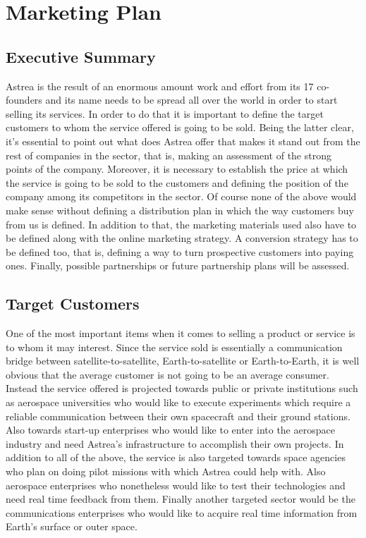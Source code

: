 \section{Marketing Plan}
\subsection{Executive Summary}
Astrea is the result of an enormous amount work and effort from its 17 co-founders and its name needs to be spread all over the world in order to start selling its services. In order to do that it is important to define the target customers to whom the service offered is going to be sold. Being the latter clear, it's essential to point out what does Astrea offer that makes it stand out from the rest of companies in the sector, that is, making an assessment of the strong points of the company. Moreover, it is necessary to establish the price at which the service is going to be sold to the customers and defining the position of the company among its competitors in the sector.
\newline\newline
Of course none of the above would make sense without defining a distribution plan in which the way customers buy from us is defined. In addition to that, the marketing materials used also have to be defined along with the online marketing strategy.
\newline\newline
A conversion strategy has to be defined too, that is, defining a way to turn prospective customers into paying ones. Finally, possible partnerships or future partnership plans will be assessed.
\subsection{Target Customers}
One of the most important items when it comes to selling a product or service is to whom it may interest. Since the service sold is essentially a communication bridge between satellite-to-satellite, Earth-to-satellite or Earth-to-Earth, it is well obvious that the average customer is not going to be an average consumer.
\newline\newline
Instead the service offered is projected towards public or private institutions such as aerospace universities who would like to execute experiments which require a reliable communication between their own spacecraft and their ground stations. Also towards start-up enterprises who would like to enter into the aerospace industry and need Astrea's infrastructure to accomplish their own projects.
\newline\newline
In addition to all of the above, the service is also targeted towards space agencies who plan on doing pilot missions with which Astrea could help with. Also aerospace enterprises who nonetheless would like to test their technologies and need real time feedback from them. Finally another targeted sector would be the communications enterprises who would like to acquire real time information from Earth's surface or outer space.

